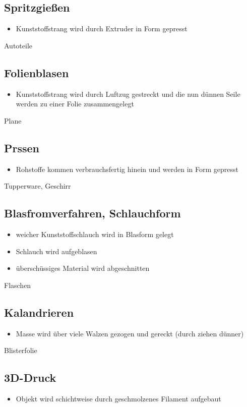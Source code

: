 \documentclass{article}
\begin{document}
\subsection*{Spritzgießen}
\begin{itemize}
\item Kunststoffstrang wird durch Extruder in Form gepresst 
\end{itemize}
Autoteile
\subsection*{Folienblasen}
\begin{itemize}
    \item Kunststoffstrang wird durch Luftzug gestreckt und die nun dünnen Seile werden zu
    einer Folie zusammengelegt
\end{itemize}
Plane
\subsection*{Prssen}
\begin{itemize}
    \item Rohstoffe kommen verbrauchsfertig hinein und werden in Form gepresst
\end{itemize}
Tupperware, Geschirr
\subsection*{Blasfromverfahren, Schlauchform}
\begin{itemize}
    \item weicher Kunststoffschlauch wird in Blasform gelegt 
    \item Schlauch wird aufgeblasen
    \item überschüssiges Material wird abgeschnitten
\end{itemize}
Flaschen
\subsection*{Kalandrieren}
\begin{itemize}
    \item Masse wird über viele Walzen gezogen und gereckt (durch ziehen dünner) 
\end{itemize}
Blisterfolie
\subsection*{3D-Druck}
\begin{itemize}
    \item Objekt wird schichtweise durch geschmolzenes Filament aufgebaut
\end{itemize}
\end{document}
